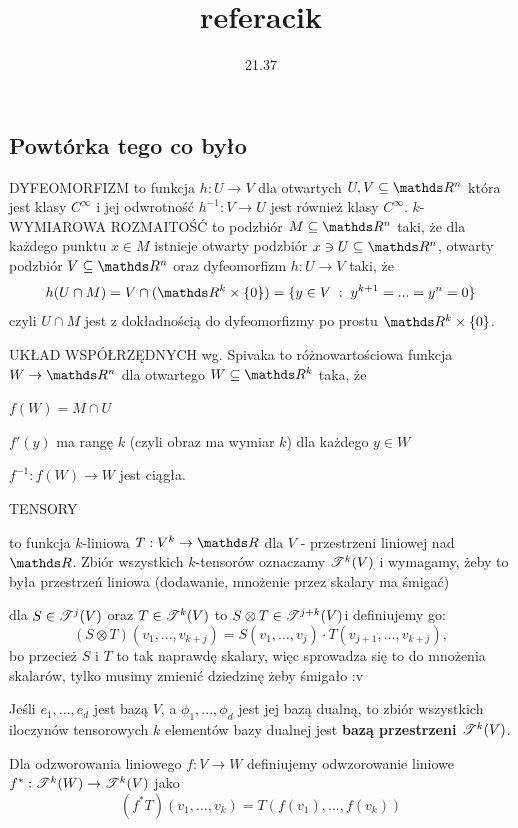 \documentclass{article}
\title{referacik}
\date{21.37}
\newcommand{\T}{\rodz{T}}
\begin{document}
\maketitle
\thispagestyle{empty}

\tableofcontents

\subsection{Powtórka tego co było}

{\large\color{def}DYFEOMORFIZM} to funkcja $h:U\to V$ dla otwartych $U,V\subseteq\R^n$ która jest klasy $C^\infty$ i jej odwrotność $h^{-1}:V\to U$ jest również klasy $C^\infty$. {\large\color{def}$k$-WYMIAROWA ROZMAITOŚĆ} to podzbiór $M\subseteq\R^n$ taki, że dla każdego punktu $x\in M$ istnieje otwarty podzbiór $x\ni U\subseteq\R^n$, otwarty podzbiór $V \subseteq\R^n$ oraz dyfeomorfizm $h:U\to V$ taki, że
$$h(U\cap M)=V\cap (\R^k\times\{0\})=\{y\in V\;:\;y^{k+1}=...=y^n=0\}$$
czyli $U\cap M$ jest z dokładnością do dyfeomorfizmy po prostu $\R^k\times\{0\}$.
\medskip

{\large\color{def}UKŁAD WSPÓŁRZĘDNYCH} wg. Spivaka to różnowartościowa funkcja $W\to\R^n$ dla otwartego $W\subseteq\R^k$ taka, że

\point $f(W)=M\cap U$

\point $f'(y)$ ma rangę $k$ (czyli obraz ma wymiar $k$) dla każdego $y\in W$

\point $f^{-1}:f(W)\to W$ jest ciągła.
\medskip

{\large\color{def}TENSORY}
\begin{description}
    \item [$k$-tensor] to funkcja $k$-liniowa $T:V^k\to\R$ dla $V$ - przestrzeni liniowej nad $\R$. Zbiór wszystkich $k$-tensorów oznaczamy $\mathcal{T}^k(V)$ i wymagamy, żeby to była przestrzeń liniowa (dodawanie, mnożenie przez skalary ma śmigać)
    \item [Iloczyn tensorowy] dla $S\in\T^j(V)$ oraz $T\in\T^k(V)$ to $S\otimes T\in\T^{j+k}(V)$i definiujemy go: $$(S\otimes T)(v_1,...,v_{k+j})=S(v_1,...,v_j)\cdot T(v_{j+1},...,v_{k+j}),$$ bo przecież $S$ i $T$ to tak naprawdę skalary, więc sprowadza się to do mnożenia skalarów, tylko musimy zmienić dziedzinę żeby śmigało :v
    \item Jeśli $e_1,...,e_d$ jest bazą $V$, a $\phi_1,...,\phi_d$ jest jej bazą dualną, to zbiór wszystkich iloczynów tensorowych $k$ elementów bazy dualnej jest \textbf{bazą przestrzeni $\T^k(V)$}.
    \item Dla odzworowania liniowego $f:V\to W$ definiujemy odwzorowanie liniowe $f^*:\T^k(W)\to\T^k(V)$ jako $$(f^*T)(v_1,...,v_k)=T(f(v_1),...,f(v_k))$$
\end{description}
\medskip
\end{document}
